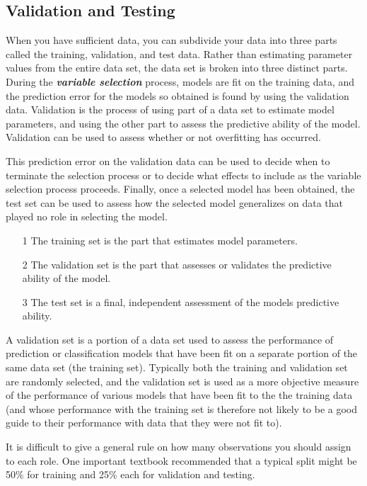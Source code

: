 \documentclass[a4paper,12pt]{article}
\begin{document}
\subsection{Validation and Testing}
When you have sufficient data, you can subdivide your data into three parts called the training, validation, and test data. Rather than estimating parameter values from the entire data set, the data set is broken into three distinct parts. During the \textbf{\textit{variable selection}} process, models are fit on the training data, and the prediction error for the models so obtained is found by using the validation data. Validation is the process of using part of a data set to estimate model parameters, and using the other part to assess the predictive ability of the model. Validation can be used to assess whether or not overfitting has occurred.

This prediction error on the validation data can be used to decide when to terminate the selection process or to decide what effects to include as the variable selection process proceeds. Finally, once a selected model has been obtained, the test set can be used to assess how the selected model generalizes on data that played no role in selecting the model.

\begin{itemize}
	\item[1] The training set is the part that estimates model parameters.
	\item[2] The validation set is the part that assesses or validates the predictive ability of the model.
	\item[3] The test set is a final, independent assessment of the models predictive ability.
\end{itemize}

A validation set is a portion of a data set used to assess the performance of prediction or classification models that have been fit on a separate portion of the same data set (the training set). Typically both the training and validation set are randomly selected, and the validation set is used as a more objective measure of the performance of various models that have been fit to the the training data (and whose performance with the training set is therefore not
likely to be a good guide to their performance with data that they were not fit to).

It is difficult to give a general rule on how many observations you should assign to each role. One important textbook recommended that a typical split might be 50\% for training and 25\% each for validation and testing.
\end{document}
